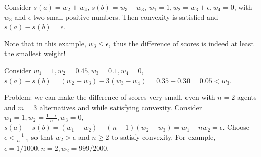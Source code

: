 Consider $s(a) = w_2 + w_4$, $s(b) = w_3 + w_3$, $w_1 = 1, w_2 = w_3 + \epsilon, w_4 = 0$, with $w_3$ and $\epsilon$ two small positive numbers. Then convexity is satisfied and $s(a) - s(b) = \epsilon$.

Note that in this example, $w_3 ≤ \epsilon$, thus the difference of scores is indeed at least the smallest weight!

Consider $w_1 = 1, w_2 = 0.45, w_3 = 0.1, w_4 = 0$, $s(a) - s(b) = (w_2 - w_3) -3 (w_3 - w_4) = 0.35 - 0.30 = 0.05 < w_3$. 

Problem: we can make the difference of scores very small, even with $n=2$ agents and $m=3$ alternatives and while satisfying convexity. Consider $w_1 = 1, w_2 = \frac{1-\epsilon}{n}, w_3 = 0$, $s(a) - s(b) = (w_1 - w_2) - (n-1) (w_2 - w_3) = w_1 - n w_2 = \epsilon$. Choose $\epsilon < \frac{1}{n+1}$ so that $w_2 > \epsilon$ and $n ≥ 2$ to satisfy convexity. For example, $\epsilon = 1/1000, n = 2, w_2 = 999/2000$.


